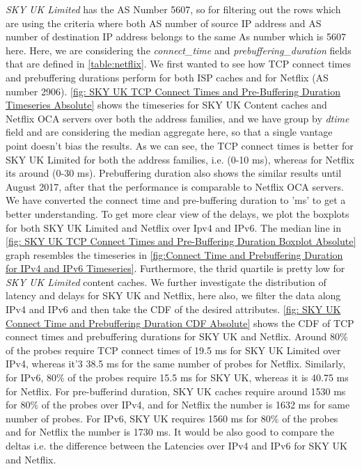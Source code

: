 \textit{SKY UK Limited} has the AS Number 5607, so for filtering out the rows which are using the criteria where both AS number of source IP address and AS number of destination IP address belongs to
the same As number which is 5607 here. Here, we are considering the \textit{connect\_time} and \textit{prebuffering\_duration} fields that are defined in \cref{table:netflix}. We first wanted to see how 
TCP connect times and prebuffering durations perform for both ISP caches and for Netflix (AS number 2906).
\cref{fig: SKY UK TCP Connect Times and Pre-Buffering Duration Timeseries Absolute} shows the timeseries for SKY UK Content caches and Netflix OCA servers over both the address families, 
and we have group by \textit{dtime} field and are considering the median aggregate here, so that a single vantage point doesn't bias the results.
As we can see, the TCP connect times is better for SKY UK Limited for both the address families, i.e. (0-10 ms), whereas for Netflix its around (0-30 ms). Prebuffering duration also shows the similar
results until August 2017, after that the performance is comparable to Netflix OCA servers. We have converted the connect time and pre-buffering duration to 'ms' to get a better understanding.
To get more clear view of the delays, we plot the boxplots for both SKY UK Limited and Netflix over Ipv4 and IPv6.  The median line in \cref{fig: SKY UK TCP Connect Times and Pre-Buffering Duration Boxplot Absolute}
graph resembles the timeseries in \cref{fig:Connect Time and Prebuffering Duration for IPv4 and IPv6 Timeseries}. Furthermore, the thrid quartile is pretty low for \textit{SKY UK Limited} content caches.
We further investigate the distribution of latency and delays for SKY UK and Netflix, here also, we filter the data along IPv4 and IPv6 and then take the CDF of the desired attributes. 
\cref{fig: SKY UK Connect Time and Prebuffering Duration CDF Absolute} shows the CDF of TCP connect times and prebuffering durations for SKY UK and Netflix. Around 80\% of the probes require TCP connect times of 19.5 ms
for SKY UK Limited over IPv4, whereas it'3 38.5 ms for the same number of probes for Netflix. Similarly, for IPv6, 80\% of the probes require 15.5 ms for SKY UK, whereas it is 40.75 ms for Netflix.
For pre-bufferind duration, SKY UK caches require around 1530 ms for 80\% of the probes over IPv4, and for Netflix the number is 1632 ms for same number of probes. For IPv6, SKY UK requires
1560 ms for 80\% of the probes and for Netflix the number is 1730 ms. It would be also good to compare the deltas i.e. the difference between the Latencies over IPv4 and IPv6 for SKY UK and Netflix.

